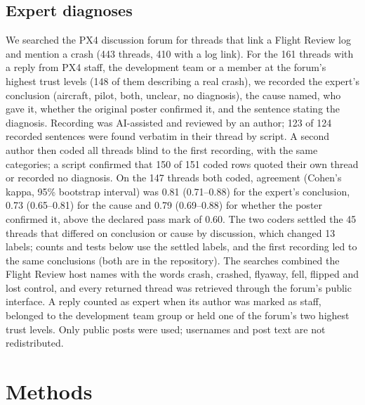 \documentclass[preprint,12pt]{elsarticle}
\begin{document}
\subsection{Expert diagnoses}
We searched the PX4 discussion forum for threads that link a Flight Review log and mention a crash (443 threads, 410
with a log link). For the 161 threads with a reply from PX4 staff, the development team or a member at the
forum's highest trust levels (148 of them describing a real crash), we recorded the expert's conclusion (aircraft, pilot, both, unclear, no diagnosis), the
cause named, who gave it, whether the original poster confirmed it, and the sentence stating the diagnosis. Recording
was AI-assisted and reviewed by an author; 123 of 124 recorded sentences were found verbatim in their thread by script.
A second author then coded all threads blind to the first recording, with the same categories; a script confirmed
that 150 of 151 coded rows quoted their own thread or recorded no diagnosis. On the 147 threads both coded,
agreement (Cohen's kappa, 95\% bootstrap interval) was 0.81 (0.71--0.88) for the expert's conclusion, 0.73
(0.65--0.81) for the cause and 0.79 (0.69--0.88) for whether the poster confirmed it, above the declared pass mark
of 0.60. The two coders settled the 45 threads that differed on conclusion or cause by discussion, which changed 13
labels; counts and tests below use the settled labels, and the first recording led to the same conclusions (both
are in the repository).
The searches combined the Flight Review host names with the words crash, crashed, flyaway, fell, flipped and lost
control, and every returned thread was retrieved through the forum's public interface. A reply counted as expert when
its author was marked as staff, belonged to the development team group or held one of the forum's two highest trust
levels. Only public posts were used; usernames and post text are not redistributed.

\section{Methods}
\label{sec:methods}
\end{document}
